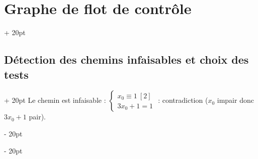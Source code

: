 \documentclass[a4paper, 12pt, twoside]{article}
\newcommand{\ind}[1][20pt]{\advance\leftskip + #1}
\newcommand{\deind}[1][20pt]{\advance\leftskip - #1}
\newenvironment{indentedenv}[1][20pt]{\par \ind[#1]}{\par \deind}
\newenvironment{indt}[2][20pt]{#2 \begin{indentedenv}[#1]}{\end{indentedenv}} %
\begin{document}
\begin{indt}{\section{Graphe de flot de contrôle}}
\begin{indt}{\subsection{Détection des chemins infaisables et choix des tests}}
            Le chemin est infaisable :
            $
                \begin{cases}
                    x_0 \equiv 1 \ [2]
                    \\
                    3x_0 + 1 = 1
                \end{cases}
            $
            : contradiction ($x_0$ impair donc $3x_0 + 1$ pair).
        \end{indt}
        
    \end{indt}

    
    
    
\end{document}
